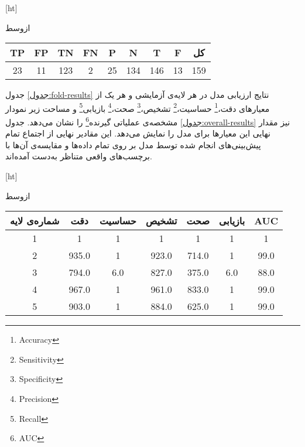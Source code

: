 [ht]

\vspace{1.5em}

‌ازوسط

\begin{tabular}{ccccccccc}
    \hline
     
    TP & FP & TN & FN  & P  & N     & T & F & کل  \\ \hline
    23 & 11 & 123& 2   & 25 & 134   &146& 13& 159\\ \hline
    \end{tabular}




جدول \ref{جدول:fold-results}
نتایج ارزیابی مدل در هر لایه‌ی آزمایشی و هر یک از معیار‌های
دقت،\footnote{Accuracy}
حساسیت،\footnote{Sensitivity}
تشخیص،\footnote{Specificity}
صحت،\footnote{Precision}
بازیابی\footnote{Recall}
و 
مساحت زیر نمودار مشخصه‌ی عملیاتی گیرنده\footnote{AUC}
را نشان می‌دهد.
جدول 
\ref{جدول:overall-results}
نیز
مقدار نهایی این معیار‌ها برای مدل را نمایش می‌دهد.
این مقادیر نهایی از اجتماع تمام پیش‌بینی‌های انجام شده توسط مدل بر روی تمام داده‌ها و مقایسه‌ی آن‌ها با برچسب‌های واقعی متناظر به‌دست آمده‌اند.

[ht]

\vspace{1.5em}


‌ازوسط

\begin{tabular}{ccccccc}
    \hline
     
    شماره‌ی لایه & دقت     & حساسیت & تشخیص    & صحت     & بازیابی & AUC \\ \hline
    1           & 1       & 1      & 1         & 1       & 1        & 1   \\ 
    2           & 935.0   & 1      & 923.0     & 714.0   & 1        & 99.0   \\ 
    3           & 794.0   & 6.0    & 827.0     & 375.0   & 6.0      & 88.0   \\ 
    4           & 967.0   & 1      & 961.0     & 833.0   & 1        & 99.0   \\ 
    5           & 903.0   & 1      & 884.0     & 625.0   & 1        & 99.0   \\ \hline
    \end{tabular}

